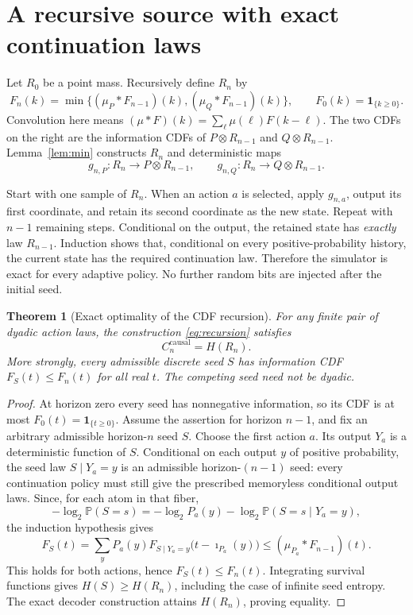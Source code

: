 \documentclass[11pt,a4paper]{article}
\newtheorem{theorem}{Theorem}
\newcommand{\Prb}{\mathbb P}
\newcommand{\ii}{\imath}
\begin{document}
\section{A recursive source with exact continuation laws}
Let $R_0$ be a point mass. Recursively define $R_n$ by
\begin{equation}\label{eq:recursion}
F_n(k)=\min\bigl\{(\mu_P*F_{n-1})(k),
                         (\mu_Q*F_{n-1})(k)\bigr\},
\qquad F_0(k)=\mathbf1_{\{k\ge0\}}.
\end{equation}
Convolution here means $(\mu*F)(k)=\sum_\ell\mu(\ell)F(k-\ell)$.
The two CDFs on the right are the information CDFs of
$P\otimes R_{n-1}$ and $Q\otimes R_{n-1}$. Lemma~\ref{lem:min}
constructs $R_n$ and deterministic maps
\begin{equation}\label{eq:decoder}
g_{n,P}:R_n\longrightarrow P\otimes R_{n-1},\qquad
g_{n,Q}:R_n\longrightarrow Q\otimes R_{n-1}.
\end{equation}

Start with one sample of $R_n$. When an action $a$ is selected, apply
$g_{n,a}$, output its first coordinate, and retain its second coordinate
as the new state. Repeat with $n-1$ remaining steps.
Conditional on the output, the retained state has \emph{exactly} law
$R_{n-1}$. Induction shows that, conditional on every positive-probability
history, the current state has the required continuation law. Therefore
the simulator is exact for every adaptive policy. No further random bits
are injected after the initial seed.

\begin{theorem}[Exact optimality of the CDF recursion]\label{thm:optimal}
For any finite pair of dyadic action laws, the construction
\eqref{eq:recursion} satisfies
\[
C_n^{\mathrm{causal}}=H(R_n).
\]
More strongly, every admissible discrete seed $S$ has information CDF
$F_S(t)\le F_n(t)$ for all real $t$. The competing seed need not be dyadic.
\end{theorem}
\begin{proof}
At horizon zero every seed has nonnegative information, so its CDF is at
most $F_0(t)=\mathbf1_{\{t\ge0\}}$. Assume the assertion for horizon
$n-1$, and fix an arbitrary admissible horizon-$n$ seed $S$.
Choose the first action $a$. Its output $Y_a$ is a deterministic function
of $S$. Conditional on each output $y$ of positive probability, the seed
law $S\mid Y_a=y$ is an admissible horizon-$(n-1)$ seed: every continuation
policy must still give the prescribed memoryless conditional output laws.
Since, for each atom in that fiber,
\[
-\log_2\Prb(S=s)
=-\log_2 P_a(y)-\log_2\Prb(S=s\mid Y_a=y),
\]
the induction hypothesis gives
\[
F_S(t)=\sum_yP_a(y)F_{S\mid Y_a=y}\bigl(t-\ii_{P_a}(y)\bigr)
\le(\mu_{P_a}*F_{n-1})(t).
\]
This holds for both actions, hence $F_S(t)\le F_n(t)$.
Integrating survival functions gives $H(S)\ge H(R_n)$, including the
case of infinite seed entropy. The exact decoder construction attains
$H(R_n)$, proving equality.
\end{proof}
\end{document}
